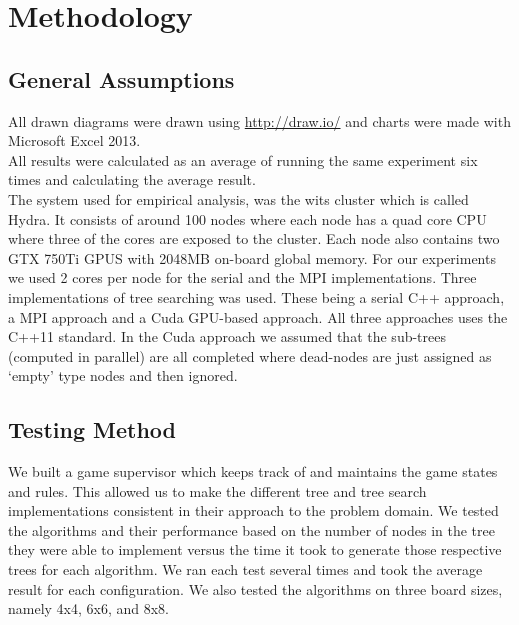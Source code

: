 \documentclass[a4paper]{report}
\begin{document}
\section{Methodology}
\subsection{General Assumptions}
All drawn diagrams were drawn using \url{http://draw.io/} and charts were made with Microsoft Excel 2013.\\ All results were calculated as an average of running the same experiment six times and calculating the average result.\\
\noindent The system used for empirical analysis, was the wits cluster which is called Hydra. It consists of around 100 nodes where each node has a quad core CPU where three of the cores are exposed to the cluster. Each node also contains two GTX 750Ti GPUS with 2048MB on-board global memory. For our experiments we used 2 cores per node for the serial and the MPI implementations.
Three implementations of tree searching was used. These being a serial C++ approach, a MPI approach and a Cuda GPU-based approach. All three approaches uses the C++11 standard.
In the Cuda approach we assumed that the sub-trees (computed in parallel) are all completed where dead-nodes are just assigned as ‘empty’ type nodes and then ignored.


\subsection{Testing Method}
We built a game supervisor which keeps track of and maintains the game states and rules. This allowed us to make the different tree and tree search implementations consistent in their approach to the problem domain. 
We tested the algorithms and their performance based on the number of nodes in the tree they were able to implement versus the time it took to generate those respective trees for each algorithm. We ran each test several times and took the average result for each configuration.
We also tested the algorithms on three board sizes, namely 4x4, 6x6, and 8x8.
\end{document}
